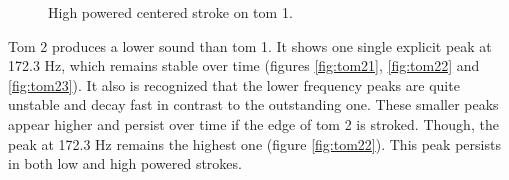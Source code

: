 \begin{figure}
	\centering
	\caption{High powered centered stroke on tom 1.}
	\label{fig:tom14}
\end{figure}


Tom 2 produces a lower sound than tom 1. It shows one single explicit peak at 172.3 Hz, which remains stable over time (figures \ref{fig:tom21}, \ref{fig:tom22} and \ref{fig:tom23}). It also is recognized that the lower frequency peaks are quite unstable and decay fast in contrast to the outstanding one. These smaller peaks appear higher and persist over time if the edge of tom 2 is stroked. Though, the peak at 172.3 Hz remains the highest one (figure \ref{fig:tom22}). This peak persists in both low and high powered strokes. 

